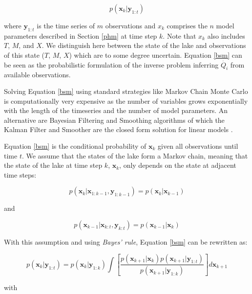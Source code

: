 \documentclass{bmcart}
\newcommand{\bm}[1]{{\textbf{#1}}}
\begin{document}
\begin{equation}\label{bsm}
    p(\bm{x}_k|\bm{y}_{1:t})
\end{equation}

where $\bm{y}_{1:t}$ is the time series of $m$ observations and $x_k$ comprises
the $n$ model parameters described in Section \ref{phm} at time step $k$. Note
that $x_k$ also includes $T$, $M$, and $X$. We distinguish here between the
state of the lake and observations of this state ($T$, $M$, $X$) which are to
some degree uncertain. Equation \ref{bsm} can be seen as the probabilistic
formulation of the inverse problem inferring $\dot{Q_i}$ from available
observations.  

Solving Equation \ref{bsm} using standard strategies like Markov Chain Monte
Carlo is computationally very expensive as the number of variables grows
exponentially with the length of the timeseries and the number of model
parameters. An alternative are Bayesian Filtering and Smoothing algorithms of
which the Kalman Filter and Smoother are the closed form solution for linear
models \cite{Kalman1960, Rauch1965, sarkkaBayesianFilteringSmoothing2013}.

Equation \ref{bsm} is the conditional probability of $\bm{x}_k$ given all
observations until time $t$. We assume that the states of the lake form a
Markov chain, meaning that the state of the lake at time step $k$, $\bm{x}_k$,
only depends on the state at adjacent time steps:

\begin{equation}\label{markov1}
    p(\bm{x}_k|\bm{x}_{1:k-1}, \bm{y}_{1:k-1}) = p(\bm{x}_k|\bm{x}_{k-1})
\end{equation}

and

\begin{equation}\label{markov2}
    p(\bm{x}_{k-1}|\bm{x}_{k:t}, \bm{y}_{k:t}) = p(\bm{x}_{k-1}|\bm{x}_{k})
\end{equation}

With this assumption and using \textit{Bayes' rule}, Equation \ref{bsm} can be
rewritten \cite{sarkkaBayesianFilteringSmoothing2013} as:

\begin{equation}\label{bsm1}
p(\bm{x}_k|\bm{y}_{1:t}) = p(\bm{x}_k|\bm{y}_{1:k})
    \int\left[\frac{p(\bm{x}_{k+1}|\bm{x}_k)p(\bm{x}_{k+1}|\bm{y}_{1:t})}{p(\bm{x}_{k+1}|\bm{y}_{1:k})}\right]d\bm{x}_{k+1}
\end{equation}

with
\end{document}
